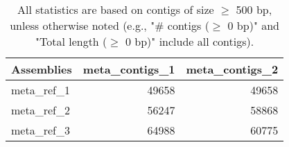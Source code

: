 \documentclass[12pt,a4paper]{article}
\begin{document}
\begin{table}[ht]
\begin{center}
\caption{All statistics are based on contigs of size $\geq$ 500 bp, unless otherwise noted (e.g., "\# contigs ($\geq$ 0 bp)" and "Total length ($\geq$ 0 bp)" include all contigs).}
\begin{tabular}{|l*{2}{|r}|}
\hline
Assemblies & meta\_contigs\_1 & meta\_contigs\_2 \\ \hline
meta\_ref\_1 & 49658 & 49658 \\ \hline
meta\_ref\_2 & 56247 & 58868 \\ \hline
meta\_ref\_3 & 64988 & 60775 \\ \hline
\end{tabular}
\end{center}
\end{table}
\end{document}
